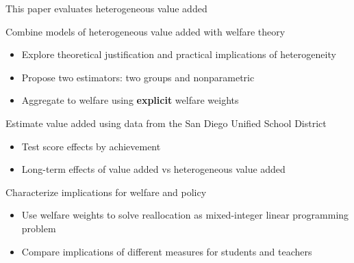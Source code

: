 \documentclass[t,aspectratio=169,11pt]{beamer}
\begin{document}

\begin{frame}{This paper evaluates heterogeneous value added}

    \vfill
    \begin{wideitemize}
        \item Combine models of heterogeneous value added with welfare theory
            \begin{itemize}
                \item Explore theoretical justification and practical implications of heterogeneity
                
                \item Propose two estimators: two groups and nonparametric
                
                \item Aggregate to welfare using {\textbf{explicit}} welfare weights
            \end{itemize}
            
        \item<2-> Estimate value added using data from the San Diego Unified School District
            \begin{itemize}
                \item Test score effects by achievement
                
                \item Long-term effects of value added vs heterogeneous value added
            \end{itemize}
        
        \item<3-> Characterize implications for welfare and policy
            \begin{itemize}
                \item Use welfare weights to solve reallocation as  mixed-integer linear programming problem
                
                \item Compare implications of different measures for students and teachers
            \end{itemize}
    \end{wideitemize}
    \vfill

\end{frame}
\end{document}
